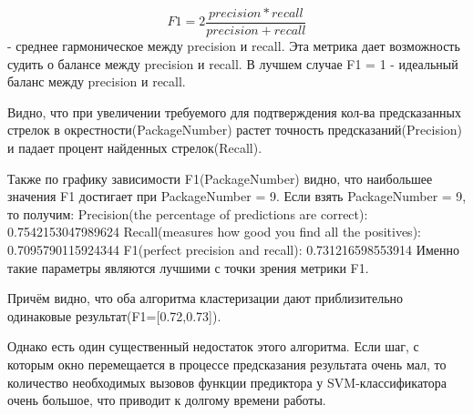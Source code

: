 \begin{equation}
F1 = 2 \dfrac{precision * recall}{precision + recall}
\end{equation} - среднее гармоническое между precision и recall. Эта метрика дает возможность судить о балансе между precision и recall. В лучшем случае F1 = 1 - идеальный баланс между precision и recall.

Видно, что при увеличении требуемого для подтверждения кол-ва предсказанных стрелок в окрестности(PackageNumber) растет точность предсказаний(Precision) и падает процент найденных стрелок(Recall).

Также по графику зависимости F1(PackageNumber) видно, что наибольшее значения F1 достигает при PackageNumber = 9. 
Если взять PackageNumber = 9, то получим:\newline
Precision(the percentage of predictions are correct): 0.7542153047989624\newline
Recall(measures how good you find all the positives): 0.7095790115924344\newline
F1(perfect precision and recall): 0.731216598553914\newline
Именно такие параметры являются лучшими с точки зрения метрики F1.

Причём видно, что оба алгоритма кластеризации дают приблизительно одинаковые результат(F1=[0.72,0.73]). 

Однако есть один существенный недостаток этого алгоритма. Если шаг, с которым окно перемещается в процессе предсказания результата очень мал, то количество необходимых вызовов функции предиктора у SVM-классификатора очень большое, что приводит к долгому времени работы.

